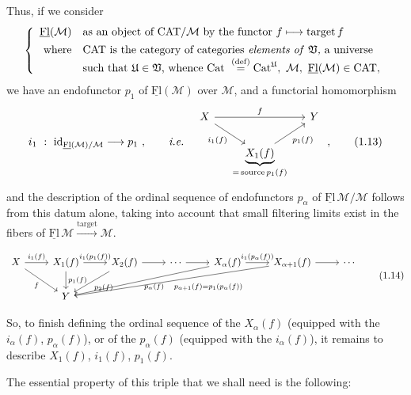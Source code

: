\documentclass[11pt]{article}
\newcommand{\printedpage}[1]{\marginpar{\footnotesize p.~#1}}
\newcommand{\msp}[1]{\marginpar{\footnotesize [#1]}}
\newcommand{\cM}{\mathcal{M}}
\newcommand{\Flu}{\underline{\mathrm{Fl}}}
\newcommand{\fU}{\mathfrak{U}}
\newcommand{\fV}{\mathfrak{V}}
\begin{document}
\printedpage{4}

Thus, if we consider
\[
\left\{
\begin{array}{rl}
\Flu(\cM) & \text{as an object of CAT}/\cM \text{ by the functor } f \longmapsto \text{target}\, f\\[1ex]
\text{where} & \text{CAT is the category of categories \textit{elements of} } \fV\text{\textit{,} a universe}\\
 & \text{such that } \fU \in \fV\text{, whence Cat } \overset{\text{(def)}}{=} \mathrm{Cat}^{\fU},\ \cM,\ \Flu(\cM) \in \text{CAT} ,
\end{array}
\right.
\]
we have an endofunctor $p_1$ of $\Flu(\cM)$ over $\cM$, and a functorial homomorphism
\[
i_1 \ : \ \mathrm{id}_{\Flu(\cM)/\cM} \longrightarrow p_1 \ , \qquad \textit{i.e.} \quad
\begin{tikzcd}[column sep=small]
X \arrow[rr, "f"] \arrow[dr, "i_1(f)"'] & & Y \\
 & \underbrace{X_1(f)}_{=\,\text{source}\, p_1(f)} \arrow[ur, "p_1(f)"'] &
\end{tikzcd} \ ,
\tag*{(1.13)}
\]
and the description of the ordinal sequence of endofunctors $p_\alpha$ of $\Flu\,\cM/\cM$ follows from this datum alone, taking into account that small filtering limits exist in the fibers of $\Flu\,\cM \xrightarrow{\text{target}} \cM$.

\msp{page 5}

\[
\begin{tikzcd}[column sep=normal]
X \arrow[r, "i_1(f)"] \arrow[dr, "f"'] & X_1(f) \arrow[r, "i_1(p_1(f))"] \arrow[d, "p_1(f)"] & X_2(f) \arrow[r] \arrow[dl, "p_2(f)"] & \cdots \arrow[r] & X_\alpha(f) \arrow[r, "i_1(p_\alpha(f))"] \arrow[dlll, "p_\alpha(f)"] & X_{\alpha+1}(f) \arrow[r] \arrow[dllll, "p_{\alpha+1}(f) = p_1(p_\alpha(f))"] & \cdots \\
 & Y & & & & &
\end{tikzcd}
\tag*{(1.14)}
\]

So, to finish defining the ordinal sequence of the $X_\alpha(f)$ (equipped with the $i_\alpha(f)$, $p_\alpha(f)$), or of the $p_\alpha(f)$ (equipped with the $i_\alpha(f)$), it remains to describe $X_1(f)$, $i_1(f)$, $p_1(f)$.

The essential property of this triple that we shall need is the following:
\end{document}
